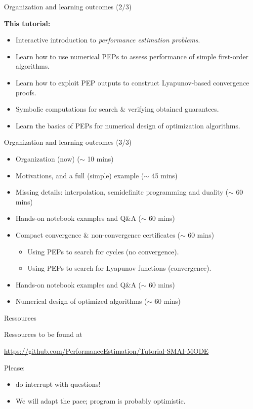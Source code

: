 \documentclass[aspectratio=169]{beamer}
\begin{document}
\begin{frame}{Organization and learning outcomes (2/3)}

\textbf{This tutorial:}

\begin{itemize} 
    \item Interactive introduction to \emph{performance estimation problems}.
    \item Learn how to use numerical PEPs to assess performance of simple first-order algorithms.
    \item Learn how to exploit PEP outputs to construct Lyapunov-based convergence proofs.
    \item Symbolic computations for search \& verifying obtained guarantees.
    \item Learn the basics of PEPs for numerical design of optimization algorithms.
\end{itemize}

\end{frame}


\begin{frame}{Organization and learning outcomes (3/3)}
\begin{itemize}
    \item[0.] Organization (now) \hfill ($\sim$ 10 mins)
    \item[1.] Motivations, and a full (simple) example \hfill ($\sim$ 45 mins)
    \item[2.] Missing details: interpolation, semidefinite programming and duality \hfill ($\sim$ 60 mins)
    \item[3.] Hands-on notebook examples and Q\&A \hfill ($\sim$ 60 mins)
    \item[4.] Compact convergence \& non-convergence certificates \hfill ($\sim$ 60 mins)
    \begin{itemize}
        \item Using PEPs to search for cycles (no convergence).
        \item Using PEPs to search for Lyapunov functions (convergence).
    \end{itemize}
    \item[5.] Hands-on notebook examples and Q\&A \hfill ($\sim$ 60 mins)
    \item[6.] Numerical design of optimized algorithms \hfill ($\sim$ 60 mins)
\end{itemize}
\end{frame}

\begin{frame}{Ressources}

Ressources to be found at
\begin{center}
	\url{https://github.com/PerformanceEstimation/Tutorial-SMAI-MODE}
\end{center}

\medskip
Please:
\begin{itemize}
	\item do interrupt with questions!
	\item We will adapt the pace; program is probably optimistic.
\end{itemize}

\end{frame}
\end{document}
